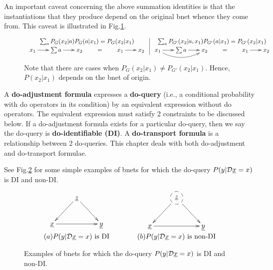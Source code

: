 An important caveat concerning the above
summation identities is that 
the instantiations that they produce depend on the
original bnet whence they come from. 
This caveat is illustrated in Fig.\ref{fig-dep-on-origing-bnet}.

\begin{figure}[h!]
$$
\begin{array}{c|c}
\sum_a P_{G}(x_2|a)P_{G}(a|x_1)=P_{G}(x_2|x_1)
&
\sum_a P_{G'}(x_2|a, x_1)P_{G'}(a|x_1)=P_{G'}(x_2|x_1)
\\
\xymatrix@C=1.5pc{
x_1\ar[r]
&\sum a\ar[r]
&x_2
&=&
x_1\ar[r]
&x_2}
&
\xymatrix@C=1.5pc{
x_1\ar[r]\ar@/_1pc/[rr]
&\sum a\ar[r]
&x_2
&=&
x_1\ar[r]
&x_2}
\end{array}
$$
\caption{Note that there are cases when $P_G(x_2|x_1)
\neq P_{G'}(x_2|x_1)$. Hence,
 $P(x_2|x_1)$ depends on the bnet of origin.
}
\label{fig-dep-on-origing-bnet}
\end{figure}

A {\bf do-adjustment
formula} expresses
a {\bf do-query} (i.e.,
a conditional probability
with do operators
in its condition) by
an equivalent expression
without do operators.
The equivalent expression must
satisfy 2 constraints
to be discussed  below.
If a do-adjustment formula
exists for a
particular do-query,
then we say the do-query is
 {\bf do-identifiable (DI)}.
A {\bf do-transport formula}
is a relationship between 2  do-queries.
This chapter deals with both
do-adjustment and do-transport
formulae.

See Fig.\ref{fig-iden-noniden}
for some simple
examples of
bnets for which
the do-query $P(y|\cald\rvx=x)$
is
DI
and non-DI.

\begin{figure}[h!]
$$
\begin{array}{ccc}
\xymatrix{
&\rvz\ar[ld]\ar[rd]
\\
\rvx\ar[rr]&&\rvy
}
&\quad\quad&
\xymatrix{
&*++[F-o]{\rvz}\ar[ld]\ar[rd]
\\
\rvx\ar[rr]&&\rvy
}
\\
(a) \text{$P(y|\cald\rvx=x)$ is DI}
&&(b) \text{$P(y|\cald\rvx=x)$ is non-DI}
\end{array}
$$
\caption{Examples of
bnets for which
the do-query $P(y|\cald\rvx=x)$
is
DI
and non-DI.
}
\label{fig-iden-noniden}
\end{figure}

